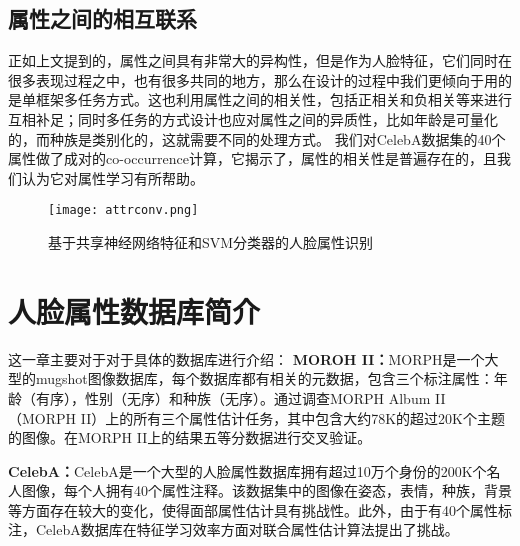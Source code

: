 \subsection{属性之间的相互联系}
正如上文提到的，属性之间具有非常大的异构性，但是作为人脸特征，它们同时在很多表现过程之中，也有很多共同的地方，那么在设计的过程中我们更倾向于用的是单框架多任务方式。这也利用属性之间的相关性，包括正相关和负相关等来进行互相补足；同时多任务的方式设计也应对属性之间的异质性，比如年龄是可量化的，而种族是类别化的，这就需要不同的处理方式。
我们对CelebA数据集的40个属性做了成对的co-occurrence计算，它揭示了，属性的相关性是普遍存在的，且我们认为它对属性学习有所帮助。
\begin{figure}[!ht]
 \centering
	\texttt{[image: attrconv.png]}
	\caption{基于共享神经网络特征和SVM分类器的人脸属性识别}
\end{figure}

\section{人脸属性数据库简介}
这一章主要对于对于具体的数据库进行介绍：
\textbf{MOROH II：}MORPH是一个大型的mugshot图像数据库，每个数据库都有相关的元数据，包含三个标注属性：年龄（有序），性别（无序）和种族（无序）。通过调查MORPH Album II（MORPH II）上的所有三个属性估计任务，其中包含大约78K的超过20K个主题的图像。在MORPH II上的结果五等分数据进行交叉验证。

\textbf{CelebA：}CelebA是一个大型的人脸属性数据库拥有超过10万个身份的200K个名人图像，每个人拥有40个属性注释。该数据集中的图像在姿态，表情，种族，背景等方面存在较大的变化，使得面部属性估计具有挑战性。此外，由于有40个属性标注，CelebA数据库在特征学习效率方面对联合属性估计算法提出了挑战。

